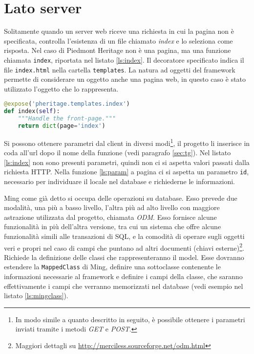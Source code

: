 \section{Lato server}
Solitamente quando un server web riceve una richiesta in cui la pagina non è specificata, controlla l'esistenza di un file chiamato \emph{index} e lo seleziona come risposta. Nel caso di Piedmont Heritage non è una pagina, ma una funzione chiamata \texttt{index}, riportata nel listato \ref{ls:index}. Il decoratore specificato indica il file \texttt{index.html} nella cartella \texttt{templates}. La natura ad oggetti del framework permette di considerare un oggetto anche una pagina web, in questo caso è stato utilizzato l'oggetto che lo rappresenta.
\begin{lstlisting}[label=ls:index,caption={root controller, funzione index, richiamata alla richiesta della pagina web da parte del client.},language=Python]
@expose('pheritage.templates.index')
def index(self):
    """Handle the front-page."""
    return dict(page='index')
\end{lstlisting}

Si possono ottenere parametri dal client in diversi modi\footnote{In modo simile a quanto descritto in seguito, è possibile ottenere i parametri inviati tramite i metodi \emph{GET} e \emph{POST}.}, il progetto li inserisce in coda all'url dopo il nome della funzione (vedi paragrafo \ref{sec:tg}). Nel listato \ref{ls:index} non sono presenti parametri, quindi non ci si aspetta valori passati dalla richiesta HTTP. Nella funzione \ref{ls:param} a pagina \pageref{ls:param} ci si aspetta un parametro \texttt{id}, necessario per individuare il locale nel database e richiederne le informazioni.

Ming come già detto si occupa delle operazioni su database. Esso prevede due modalità, una più a basso livello, l'altra più ad alto livello con maggiore astrazione utilizzata dal progetto, chiamata \emph{ODM}. Esso fornisce alcune funzionalità in più dell'altra versione, tra cui un sistema che offre alcune funzionalità simili alle transazioni di SQL, e la comodità di operare sugli oggetti veri e propri nel caso di campi che puntano ad altri documenti (chiavi esterne)\footnote{Maggiori dettagli su \url{http://merciless.sourceforge.net/odm.html}}. Richiede la definizione delle classi che rappresenteranno il model. Esse dovranno estendere la \texttt{MappedClass} di Ming, definire una sottoclasse contenente le informazioni necessarie al framework e definire i campi della classe, che saranno effettivamente i campi che verranno memorizzati nel database (vedi esempio nel listato \ref{ls:mingclass}).

